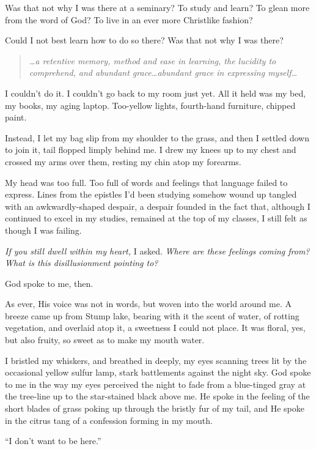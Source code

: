 Was that not why I was there at a seminary? To study and learn? To glean more from the word of God? To live in an ever more Christlike fashion?

Could I not best learn how to do so there? Was that not why I was there?

\begin{quote}
\emph{\ldots a retentive memory, method and ease in learning, the lucidity to comprehend, and abundant grace\ldots abundant grace in expressing myself\ldots{}}
\end{quote}

I couldn't do it. I couldn't go back to my room just yet. All it held was my bed, my books, my aging laptop. Too-yellow lights, fourth-hand furniture, chipped paint.

Instead, I let my bag slip from my shoulder to the grass, and then I settled down to join it, tail flopped limply behind me. I drew my knees up to my chest and crossed my arms over them, resting my chin atop my forearms.

My head was too full. Too full of words and feelings that language failed to express. Lines from the epistles I'd been studying somehow wound up tangled with an awkwardly-shaped despair, a despair founded in the fact that, although I continued to excel in my studies, remained at the top of my classes, I still felt as though I was failing.

\emph{If you still dwell within my heart,} I asked. \emph{Where are these feelings coming from? What is this disillusionment pointing to?}

God spoke to me, then.

As ever, His voice was not in words, but woven into the world around me. A breeze came up from Stump lake, bearing with it the scent of water, of rotting vegetation, and overlaid atop it, a sweetness I could not place. It was floral, yes, but also fruity, so sweet as to make my mouth water.

I bristled my whiskers, and breathed in deeply, my eyes scanning trees lit by the occasional yellow sulfur lamp, stark battlements against the night sky. God spoke to me in the way my eyes perceived the night to fade from a blue-tinged gray at the tree-line up to the star-stained black above me. He spoke in the feeling of the short blades of grass poking up through the bristly fur of my tail, and He spoke in the citrus tang of a confession forming in my mouth.

``I don't want to be here.''


